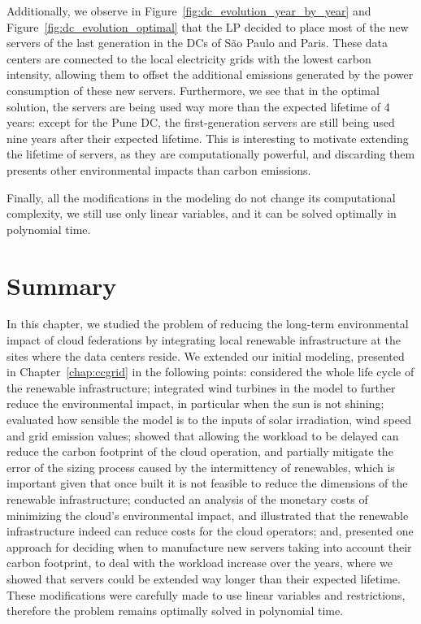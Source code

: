 Additionally, we observe in Figure~\ref{fig:dc_evolution_year_by_year} and Figure~\ref{fig:dc_evolution_optimal} that the LP decided to place most of the new servers of the last generation in the DCs of São Paulo and Paris. These data centers are connected to the local electricity grids with the lowest carbon intensity, allowing them to offset the additional emissions generated by the power consumption of these new servers. Furthermore, we see that in the optimal solution, the servers are being used way more than the expected lifetime of 4 years: except for the Pune DC, the first-generation servers are still being used nine years after their expected lifetime. This is interesting to motivate extending the lifetime of servers, as they are computationally powerful, and discarding them presents other environmental impacts than carbon emissions. 

Finally, all the modifications in the modeling do not change its computational complexity, we still use only linear variables, and it can be solved optimally in polynomial time.

\section{Summary}

\label{sec:long_term_conclusion}

In this chapter, we studied the problem of reducing the long-term environmental impact of cloud federations by integrating local renewable infrastructure at the sites where the data centers reside. We extended our initial modeling, presented in Chapter~\ref{chap:ccgrid} in the following points: considered the whole life cycle of the renewable infrastructure; integrated wind turbines in the model to further reduce the environmental impact, in particular when the sun is not shining;  evaluated how sensible the model is to the inputs of solar irradiation, wind speed and grid emission values; showed that allowing the workload to be delayed can reduce the carbon footprint of the cloud operation, and partially mitigate the error of the sizing process caused by the intermittency of renewables, which is important given that once built it is not feasible to reduce the dimensions of the renewable infrastructure;  conducted an analysis of the monetary costs of minimizing the cloud's  environmental impact, and illustrated that the renewable infrastructure indeed can reduce costs for the cloud operators; and, presented one approach for deciding when to manufacture new servers taking into account their carbon footprint, to deal with the workload increase over the years, where we showed that servers could be extended way longer than their expected lifetime. These modifications were carefully made to use linear variables and restrictions, therefore the problem remains optimally solved in polynomial time.

